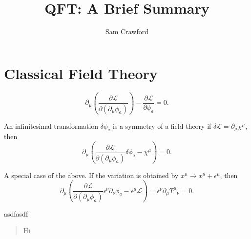 \documentclass[12pt]{article}
\begin{document}
	
	\title{QFT: A Brief Summary}
	\author{Sam Crawford}
	
	\maketitle

\section{Classical Field Theory}
	
\begin{noteEquation}
	\begin{equation}
		\partial_\mu \left( \frac{\partial \mathcal{L}}{\partial (\partial_\mu \phi_a)} \right) - \frac{\partial \mathcal{L}}{\partial \phi_a} = 0.
	\end{equation}
\end{noteEquation}

\begin{noteEquation}
An infinitesimal transformation $\delta \phi_a$ is a symmetry of a field theory if $\delta \mathcal{L} = \partial_\mu \chi^\mu$, then
	\begin{equation}
		\partial_\mu \left( \frac{\partial \mathcal{L}}{\partial (\partial_\mu \phi_a)} \delta \phi_a - \chi^\mu \right) = 0.
	\end{equation}
\end{noteEquation}

\begin{noteEquation}
	A special case of the above. If the variation is obtained by $x^\mu \to x^\mu + \epsilon^\mu$, then
		\begin{equation}
			\partial_\mu \left( \frac{\partial \mathcal{L}}{\partial (\partial_\mu \phi_a)} \epsilon^\nu \partial_\nu \phi_a - \epsilon^\mu \mathcal{L} \right) = \epsilon^\nu \partial_\mu {T^\mu}_\nu = 0.
		\end{equation}
\end{noteEquation}

asdfasdf
\blockquote{Hi}
\end{document}
